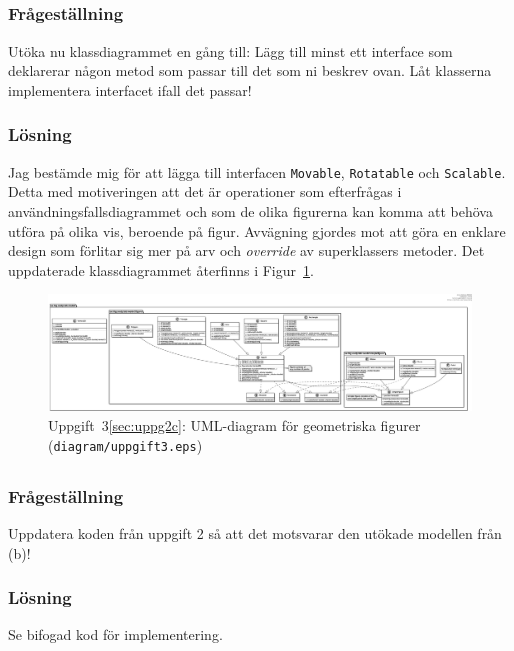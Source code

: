 \subsection{}\label{sec:uppg3b}
\subsubsection*{Frågeställning}
Utöka nu klassdiagrammet en gång till: Lägg till minst ett interface som
deklarerar någon metod som passar till det som ni beskrev ovan. Låt klasserna
implementera interfacet ifall det passar!

\subsubsection*{Lösning}
Jag bestämde mig för att lägga till interfacen \texttt{Movable},
\texttt{Rotatable} och \texttt{Scalable}. Detta med motiveringen att det
är operationer som efterfrågas i användningsfallsdiagrammet och som de olika
figurerna kan komma att behöva utföra på olika vis, beroende på figur.
Avvägning gjordes mot att göra en enklare design som förlitar sig mer på arv
och \emph{override} av superklassers metoder. Det uppdaterade klassdiagrammet
återfinns i Figur~\ref{fig:uppg3b}.

\begin{figure}
\centering
\includegraphics[width=\linewidth]{diagram/uppgift3.eps}
\caption{Uppgift~3\ref{sec:uppg2c}: UML-diagram för geometriska figurer
(\texttt{diagram/uppgift3.eps})}
\label{fig:uppg3b}
\end{figure}



\subsection{}\label{sec:uppg3c}
\subsubsection*{Frågeställning}
Uppdatera koden från uppgift 2 så att det motsvarar den utökade modellen från
(b)!

\subsubsection*{Lösning}
Se bifogad kod för implementering.
